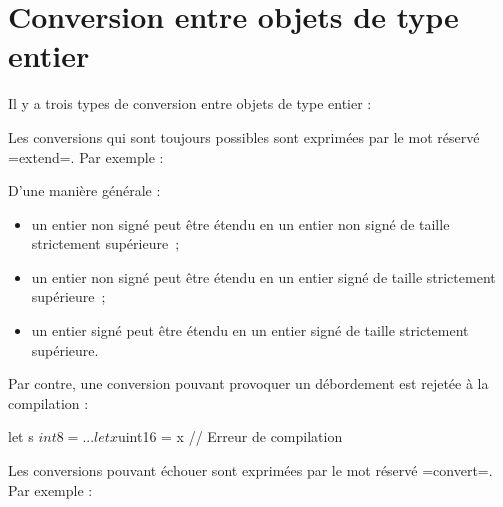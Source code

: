 \section{Conversion entre objets de type entier}

Il y a trois types de conversion entre objets de type entier :



Les conversions qui sont toujours possibles sont exprimées par le mot réservé \plm=extend=. Par exemple :

D'une manière générale :
\begin{itemize}
\item un entier non signé peut être étendu en un entier non signé de taille strictement supérieure~;
\item un entier non signé peut être étendu en un entier signé de taille strictement supérieure~;
\item un entier signé peut être étendu en un entier signé de taille strictement supérieure.
\end{itemize}

Par contre, une conversion pouvant provoquer un débordement est rejetée à la compilation :
\begin{PLM}
let s $int8 = ...
let x $uint16 = x // Erreur de compilation
\end{PLM}





Les conversions pouvant échouer sont exprimées par le mot réservé \plm=convert=. Par exemple :

